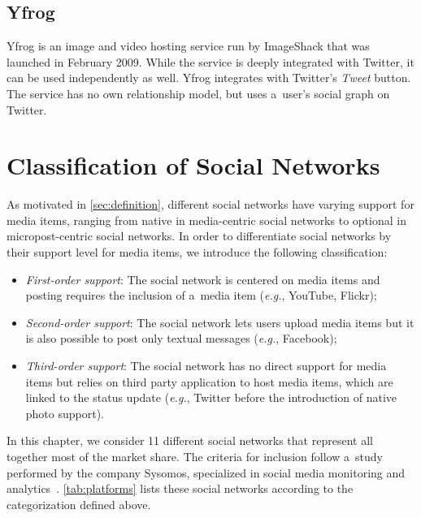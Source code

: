 \subsection{Yfrog}
Yfrog is an image and video hosting service run by ImageShack that was launched in February 2009.
While the service is deeply integrated with Twitter, it can be used independently as well.
Yfrog integrates with Twitter's \emph{Tweet} button.
The service has no own relationship model, but uses a~user's social graph on Twitter.

\section{Classification of Social Networks} \label{sec:classification-of-social-networks}
As motivated in \autoref{sec:definition}, different social networks have varying support
for media items, ranging from native in media-centric social networks
to optional in micropost-centric social networks.
In order to differentiate social networks by their support level for media items,
we introduce the following classification:

\begin{itemize}
  \item \emph{First-order support}: The social network is centered on media items and posting requires the inclusion of a~media item (\emph{e.g.}, YouTube, Flickr);
  \item \emph{Second-order support}: The social network lets users upload media items but it is also possible to post only textual messages (\emph{e.g.}, Facebook);
  \item \emph{Third-order support}: The social network has no direct support for media items but relies on third party application to host media items,
which are linked to the status update (\emph{e.g.}, Twitter before the introduction of native photo support).
\end{itemize}

In this chapter, we consider 11 different social networks that represent all together most of the market share.
The criteria for inclusion follow a~study performed by the company Sysomos, specialized in social media monitoring and analytics~\cite{Levine2011}.
\autoref{tab:platforms} lists these social networks according to the categorization defined above.

